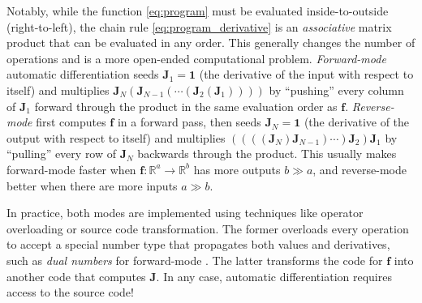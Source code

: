 \documentclass{aa}
\begin{document}
Notably, while the function \eqref{eq:program} must be evaluated inside-to-outside (right-to-left),
the chain rule \eqref{eq:program_derivative} is an \emph{associative} matrix product that can be evaluated in any order.
This generally changes the number of operations and is a more open-ended computational problem.
\textit{Forward-mode} automatic differentiation seeds $\boldsymbol{J}_1 = \boldsymbol{1}$ (the derivative of the input with respect to itself) and multiplies $\boldsymbol{J}_N (\boldsymbol{J}_{N-1} (\cdots (\boldsymbol{J}_2 (\boldsymbol{J}_1))))$ by \enquote{pushing} every column of $\boldsymbol{J}_1$ forward through the product in the same evaluation order as $\boldsymbol{f}$.
\textit{Reverse-mode} first computes $\boldsymbol{f}$ in a forward pass, then seeds $\boldsymbol{J}_N = \boldsymbol{1}$ (the derivative of the output with respect to itself) and multiplies $((((\boldsymbol{J}_N) \boldsymbol{J}_{N-1}) \cdots) \boldsymbol{J}_2) \boldsymbol{J}_1$ by \enquote{pulling} every row of $\boldsymbol{J}_N$ backwards through the product.
This usually makes forward-mode faster when $\boldsymbol{f}: \mathbb{R}^a \rightarrow \mathbb{R}^b$ has more outputs $b \gg a$, and reverse-mode better when there are more inputs $a \gg b$.

In practice, both modes are implemented using techniques like operator overloading or source code transformation.
The former overloads every operation to accept a special number type that propagates both values and derivatives, such as \textit{dual numbers} for forward-mode \cite[e.g.][]{revelsForwardModeAutomaticDifferentiation2016}.
The latter transforms the code for $\boldsymbol{f}$ into another code that computes $\boldsymbol{J}$.
In any case, automatic differentiation requires access to the source code!

\iffalse
Forward-mode seeds $\partial f_{1,i} / \partial f_{1,j} = \delta_{ij}$ (for every $i$) and propagates $\frac{\partial f_{n+1,i}}{\partial f_{1,j}} = \sum_k \frac{\partial f_{n+1,i}}{\partial f_{n,k}} \frac{\partial f_{n,k}}{\partial f_{1,j}}$ with a \emph{Jacobian-vector product}.
It must be re-seeded for every \emph{input} parameter $j$ and is thus most efficient when there are more outputs $b \gg a$.
Reverse-mode seeds $\partial f_{N,i} / \partial f_{N,j} = \delta_{ij}$ and propagates $\frac{\partial f_{N,i}}{\partial f_{n-1,j}} = \sum_k \frac{\partial f_{N,i}}{\partial f_{n,k}} \frac{\partial f_{n,k}}{\partial f_{n-1,j}}$.
It must be re-seeded for every \emph{output} parameter $j$ is therefore faster when there are more inputs $m \gg n$.
\fi
\end{document}
